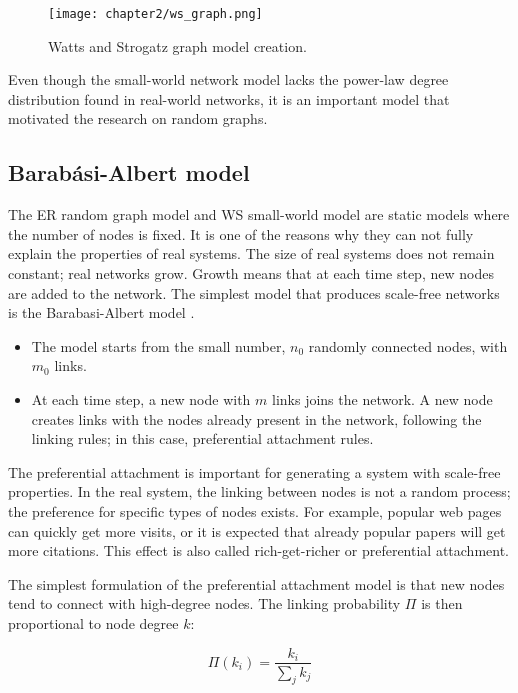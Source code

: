\begin{figure}[H]
	\centering
	\texttt{[image: chapter2/ws\_graph.png]}
	\caption[Watts and Strogatz graph model creation]{Watts and Strogatz graph model creation.}
	\label{fig:wsgraph}
\end{figure}

Even though the small-world network model lacks the power-law degree distribution found in real-world networks, it is an important model that motivated the research on random graphs. 

\subsection{Barab\' {a}si-Albert model}

The ER random graph model and WS small-world model are static models where the number of nodes is fixed. It is one of the reasons why they can not fully explain the properties of real systems. The size of real systems does not remain constant; real networks grow. Growth means that at each time step, new nodes are added to the network. The simplest model that produces scale-free networks is the Barabasi-Albert model \cite{barabasi1999}.

\begin{itemize}
	\item The model starts from the small number, $n_0$ randomly connected nodes, with $m_0$ links.
	\item At each time step, a new node with $m$ links joins the network. A new node creates links with the nodes already present in the network, following the linking rules; in this case, preferential attachment rules. 
\end{itemize}

The preferential attachment is important for generating a system with scale-free properties. In the real system, the linking between nodes is not a random process; the preference for specific types of nodes exists. For example, popular web pages can quickly get more visits, or it is expected that already popular papers will get more citations. This effect is also called rich-get-richer or preferential attachment.

The simplest formulation of the preferential attachment model is that new nodes tend to connect with high-degree nodes. The linking probability $\Pi$ is then proportional to node degree $k$:  

\begin{equation}
\Pi(k_i) = \frac{k_i}{\sum_jk_j} 
\end{equation} 

